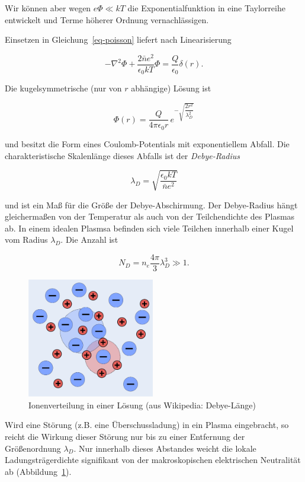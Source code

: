 \documentclass[
  a4paper,
  DIV=11]{scrreprt}
\begin{document}
Wir können aber wegen \(e\Phi \ll kT\) die Exponentialfunktion in eine
Taylorreihe entwickelt und Terme höherer Ordnung vernachlässigen.

Einsetzen in Gleichung~\ref{eq-poisson} liefert nach Linearisierung

\[
-\nabla^2 \Phi + \frac{2 \bar n e^2}{\epsilon_0 k T} \Phi = \frac{Q}{\epsilon_0}\delta(r).
\]

Die kugelsymmetrische (nur von \(r\) abhängige) Lösung ist

\[
\Phi(r) = \frac{Q}{4 \pi \epsilon_0 r} \, e^{-\sqrt{\dfrac{2r^2}{\lambda_D^2}}}
\]

und besitzt die Form eines Coulomb-Potentials mit exponentiellem Abfall.
Die charakteristische Skalenlänge dieses Abfalls ist der
\emph{Debye-Radius}

\[
\lambda_D = \sqrt{ \frac{\epsilon_0 k T}{\bar n e^2}}
\]

und ist ein Maß für die Größe der Debye-Abschirmung. Der Debye-Radius
hängt gleichermaßen von der Temperatur als auch von der Teilchendichte
des Plasmas ab. In einem idealen Plasmsa befinden sich viele Teilchen
innerhalb einer Kugel vom Radius \(\lambda_D\). Die Anzahl ist

\[
N_D = n_e \frac{4 \pi}{3} \lambda_D^3 \gg 1.
\]

\begin{figure}

{\centering \includegraphics[width=2.1875in,height=\textheight]{./images/paste-D4D1A82B.png}

}

\caption{\label{fig-ionenverteilung}Ionenverteilung in einer Lösung (aus
Wikipedia: Debye-Länge)}

\end{figure}

Wird eine Störung (z.B. eine Überschussladung) in ein Plasma
eingebracht, so reicht die Wirkung dieser Störung nur bis zu einer
Entfernung der Größenordnung \(\lambda_D\). Nur innerhalb dieses
Abstandes weicht die lokale Ladungsträgerdichte signifikant von der
makroskopischen elektrischen Neutralität ab
(Abbildung~\ref{fig-ionenverteilung}).
\end{document}
